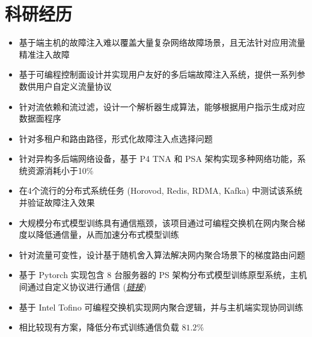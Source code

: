 \documentclass{resume}
\begin{document}
\section{科研经历}

\begin{itemize}[parsep=0.5ex]
  \item 基于端主机的故障注入难以覆盖大量复杂网络故障场景，且无法针对应用流量精准注入故障
  \item 基于可编程控制面设计并实现用户友好的多后端故障注入系统，提供一系列参数供用户自定义流量协议
  \item 针对流依赖和流过滤，设计一个解析器生成算法，能够根据用户指示生成对应数据面程序
  \item 针对多租户和路由路径，形式化故障注入点选择问题
  \item 针对异构多后端网络设备，基于 P4 TNA 和 PSA 架构实现多种网络功能，系统资源消耗小于10\%
  \item 在4个流行的分布式系统任务 (Horovod, Redis, RDMA, Kafka) 中测试该系统并验证故障注入效果
\end{itemize}

\begin{itemize}[parsep=0.5ex]
  \item 大规模分布式模型训练具有通信瓶颈，该项目通过可编程交换机在网内聚合梯度以降低通信量，从而加速分布式模型训练
  \item 针对流量可变性，设计基于随机舍入算法解决网内聚合场景下的梯度路由问题
  \item 基于 Pytorch 实现包含 8 台服务器的 PS 架构分布式模型训练原型系统，主机间通过自定义协议进行通信 (\href{https://github.com/Fangjin98/distributed-training-INA/}{\textit{链接}})
  \item 基于 Intel Tofino 可编程交换机实现网内聚合逻辑，并与主机端实现协同训练
  \item 相比较现有方案，降低分布式训练通信负载 $81.2\%$
\end{itemize}

\end{document}

